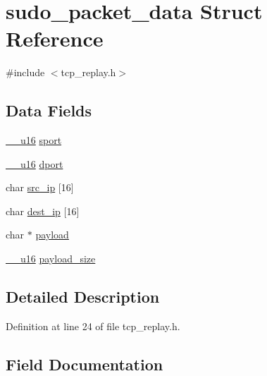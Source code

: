 \hypertarget{structsudo__packet__data}{}\section{sudo\+\_\+packet\+\_\+data Struct Reference}
\label{structsudo__packet__data}


{\ttfamily \#include $<$tcp\+\_\+replay.\+h$>$}

\subsection*{Data Fields}
\begin{DoxyCompactItemize}
\item 
\hyperlink{asm__types_8h_abc70358187152575fd05fbf6d253151f}{\+\_\+\+\_\+u16} \hyperlink{structsudo__packet__data_a5932845efeeab2e1c9720ebebe6bb87c}{sport}
\item 
\hyperlink{asm__types_8h_abc70358187152575fd05fbf6d253151f}{\+\_\+\+\_\+u16} \hyperlink{structsudo__packet__data_a9ff52b16b68df839c89d7b8f51fe7259}{dport}
\item 
char \hyperlink{structsudo__packet__data_a6fd5d347f32793884e74b1b1588056e0}{src\+\_\+ip} \mbox{[}16\mbox{]}
\item 
char \hyperlink{structsudo__packet__data_a3e6ec203a569898718a2ce12add8f855}{dest\+\_\+ip} \mbox{[}16\mbox{]}
\item 
char $\ast$ \hyperlink{structsudo__packet__data_a18f141cb2726073503afb9f1d6c85efb}{payload}
\item 
\hyperlink{asm__types_8h_abc70358187152575fd05fbf6d253151f}{\+\_\+\+\_\+u16} \hyperlink{structsudo__packet__data_aa8e703deac4070d517c0306948349b50}{payload\+\_\+size}
\end{DoxyCompactItemize}


\subsection{Detailed Description}


Definition at line 24 of file tcp\+\_\+replay.\+h.



\subsection{Field Documentation}
\mbox{\label{structsudo__packet__data_a3e6ec203a569898718a2ce12add8f855}} 
